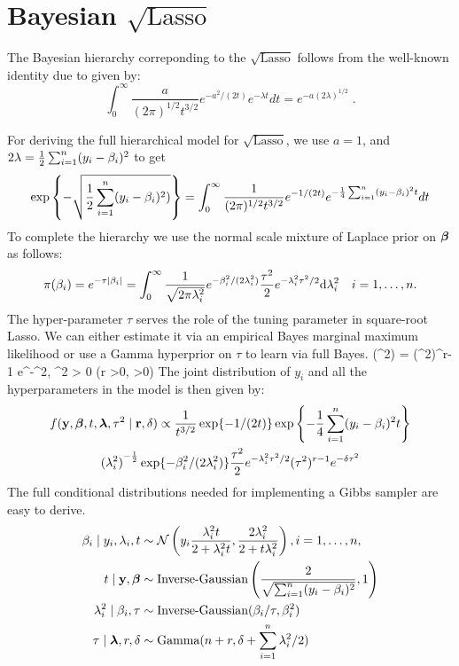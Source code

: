\documentclass[12pt]{article}
\begin{document}
\section{Bayesian $\sqrt{\text{Lasso}}$ }

The Bayesian hierarchy correponding to the $\sqrt{\text{Lasso}}$ follows from the well-known identity due to \citet{levy1940certains} given by:
\begin{equation}
  \int_{0}^{\infty} \frac{a}{(2 \pi)^{1/2} t^{3/2}} e^{-{a^2}/({2 t})} e^{-\lambda t} dt = e^{-a (2 \lambda)^{1/2} } \;.\label{eq:levy}
\end{equation}

For deriving the full hierarchical model for $\sqrt{\text{Lasso}}$, we use $a = 1$, and $2\lambda = \frac{1}{2} \sum_{i=1}^{n} (y_i - \beta_i)^2$ to get 
\begin{equation}
\exp \left\{-\sqrt{\frac{1}{2} \sum_{i=1}^{n} (y_i - \beta_i)^2)} \right\} = \int_{0}^{\infty} \frac{1}{(2 \pi)^{1/2} t^{3/2}} e^{-{1}/({2 t})} e^{- \frac{1}{4} \sum_{i=1}^{n} (y_i - \beta_i)^2 t} dt
\end{equation}
To complete the hierarchy we use the normal scale mixture of Laplace prior on $\boldsymbol{\beta}$ as follows:
\[
\pi(\beta_i) = e^{-\tau \lvert\beta_i\rvert} = \int_{0}^{\infty} \frac{1}{\sqrt{2\pi \lambda_i^2}} e^{-\beta_i^2/(2\lambda_i^2)} \frac{\tau^2}{2} e^{-\lambda_i^2\tau^2/2} {\rm d} \lambda_i^2 \quad i = 1, \ldots, n.
\]
The hyper-parameter $\tau$ serves the role of the tuning parameter in square-root Lasso. We can either estimate it via an empirical Bayes marginal maximum likelihood or use a Gamma hyperprior on $\tau$ to learn via full Bayes. 
\beq
\pi(\tau^2) =  (\tau^2)^{r-1} e^{-\delta \tau^2}, \; \tau^2 > 0 (r >0, \delta >0)
\eeq
The joint distribution of $y_i$ and all the hyperparameters in the model is then given by:
\begin{multline}
f({\bf y}, \boldsymbol{\beta}, t, \boldsymbol{\lambda}, \tau^2 \mid {\bf r}, \delta) \propto 
\frac{1}{t^{3/2}} \exp\{-{1}/({2 t}) \} \exp \left\{- \frac{1}{4} \sum_{i=1}^{n} (y_i - \beta_i)^2 t \right\} \\
{(\lambda_i^2)}^{-\frac{1}{2}} \exp\{-\beta_i^2/(2\lambda_i^2)\} \frac{\tau^2}{2} e^{-\lambda_i^2\tau^2/2} (\tau^2)^{r-1} e^{-\delta \tau^2}
\end{multline}
The full conditional distributions needed for implementing a Gibbs sampler are easy to derive. 
\begin{align}
\beta_i \mid y_i, \lambda_i, t & \sim \mathcal{N} \left(y_i \frac{\lambda_i^2 t}{2 + \lambda_i^2 t}, \frac{2 \lambda_i^2}{2 + t \lambda_i^2} \right), i = 1, \ldots, n, \\
t \mid {\bf y}, \boldsymbol{\beta} & \sim \text{Inverse-Gaussian} \left(\frac{2}{\sqrt{\sum_{i=1}^{n}(y_i - \beta_i)^2}}, 1 \right) \\
\lambda_i^2 \mid \beta_i, \tau & \sim \text{Inverse-Gaussian}(\beta_i / \tau, \beta_i^2)\\
\tau \mid \boldsymbol{\lambda}, r, \delta & \sim \text{Gamma}(n + r, \delta + \sum_{i=1}^{n} \lambda_i^2/2)
\end{align}
\end{document}
